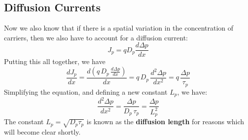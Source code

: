 \subsection{Diffusion Currents}
Now we also know that if there is a spatial variation in the concentration of carriers, then we also have to account for a diffusion current:
    \begin{equation}
        J_p = q D_p \frac{d\Delta p}{dx}
    \end{equation}
Putting this all together, we have 
    \begin{equation}
        \frac{dJ_p}{dx} = \frac{d(q\,D_p\,\frac{d\Delta p}{dx})}{dx} = q\,D_p\,\frac{d^2 \Delta  p}{dx^2} = q\,\frac{\Delta p}{\tau_p}
    \end{equation}
Simplifying the equation, and defining a new constant $L_p$, we have:
    \begin{equation}
        \frac{d^2 \Delta p}{dx^2} = \frac{\Delta p}{D_p\,\tau_p} = \frac{\Delta p}{L_p^2}
        \label{eq:continuity}
    \end{equation}
The constant $L_p = \sqrt{D_p \tau_p}$ is known as the \textbf{diffusion length} for reasons which will become clear shortly.
